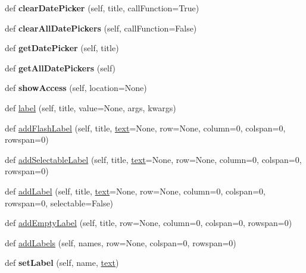 \begin{DoxyCompactItemize}
def {\bfseries clear\+Date\+Picker} (self, title, call\+Function=True)
\item 
\mbox{\label{classappjar_1_1gui_add0e14923a537cf54a691e879d8c186b}} 
def {\bfseries clear\+All\+Date\+Pickers} (self, call\+Function=False)
\item 
\mbox{\label{classappjar_1_1gui_ae3d5d91238da5411973b20935d2b57b6}} 
def {\bfseries get\+Date\+Picker} (self, title)
\item 
\mbox{\label{classappjar_1_1gui_a2c8faae419bf5ab7d8d377b2fc415663}} 
def {\bfseries get\+All\+Date\+Pickers} (self)
\item 
\mbox{\label{classappjar_1_1gui_a76d3d51fa26510201f68d69fc4d70fac}} 
def {\bfseries show\+Access} (self, location=None)
\item 
def \hyperlink{classappjar_1_1gui_a161659a9096715ced2da924ab88ddecc}{label} (self, title, value=None, args, kwargs)
\item 
def \hyperlink{classappjar_1_1gui_aebdbd28fa436f476eee09361d80e44f7}{add\+Flash\+Label} (self, title, \hyperlink{classappjar_1_1gui_a221b516425bf76dd8560ec9f4818182f}{text}=None, row=None, column=0, colspan=0, rowspan=0)
\item 
def \hyperlink{classappjar_1_1gui_a8a45e3f03c919beabdd26156d156f959}{add\+Selectable\+Label} (self, title, \hyperlink{classappjar_1_1gui_a221b516425bf76dd8560ec9f4818182f}{text}=None, row=None, column=0, colspan=0, rowspan=0)
\item 
def \hyperlink{classappjar_1_1gui_aa2108c54eeeb1db272337524494d2a03}{add\+Label} (self, title, \hyperlink{classappjar_1_1gui_a221b516425bf76dd8560ec9f4818182f}{text}=None, row=None, column=0, colspan=0, rowspan=0, selectable=False)
\item 
def \hyperlink{classappjar_1_1gui_a922c9762b3770888073f2b7a559de77e}{add\+Empty\+Label} (self, title, row=None, column=0, colspan=0, rowspan=0)
\item 
def \hyperlink{classappjar_1_1gui_aaf933aa526da74071c15df1794642a96}{add\+Labels} (self, names, row=None, colspan=0, rowspan=0)
\item 
\mbox{\label{classappjar_1_1gui_ab68acc8b806299dddee959e9a6f85a77}} 
def {\bfseries set\+Label} (self, name, \hyperlink{classappjar_1_1gui_a221b516425bf76dd8560ec9f4818182f}{text})

\end{DoxyCompactItemize}
